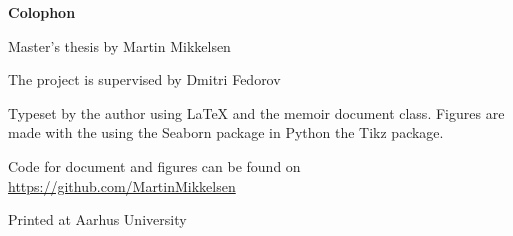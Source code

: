 \makeatletter
\edef\fontandleading{\@memptsize.0/\the\baselineskip}
\makeatother
\thispagestyle{empty}
\strut\vfill
{
	\setlength{\parindent}{0pt}
	\addtolength{\parskip}{.6em}
	
	\begin{center}
		\bfseries\sffamily Colophon
	\end{center}
	
	\small
	
	\textsl{\projecttitle}
	
	\smallskip
	
	Master's thesis by Martin Mikkelsen
	
	The project is supervised by Dmitri Fedorov
	
	Typeset by the author using \LaTeX{} and the \textsf{memoir} document class. Figures are made with the using the Seaborn package in Python the Tikz package.
	
	Code for document and figures can be found on \url{https://github.com/MartinMikkelsen}
	
	Printed at Aarhus University
}
\newpage